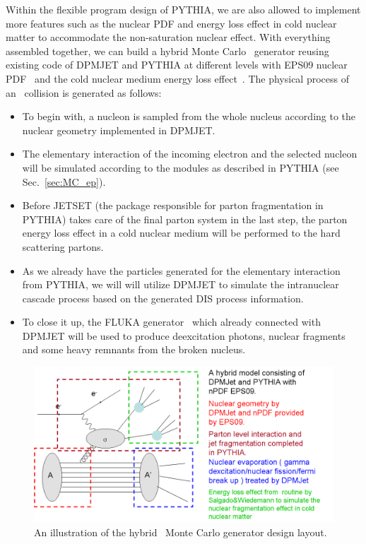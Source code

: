 Within the flexible program design of PYTHIA, we are also allowed to implement
more features such as the nuclear PDF and energy loss effect in cold nuclear
matter to accommodate the non-saturation nuclear effect. 
With everything assembled together, we can build a hybrid Monte Carlo \eA\ generator reusing existing
code of DPMJET and PYTHIA at different levels with EPS09 nuclear PDF~\cite{Eskola:2009uj}
and the cold nuclear medium energy loss effect~\cite{Salgado:2003gb}. The physical process of an \eA\ collision is
generated as follows:

\begin{itemize}
    \item To begin with, a nucleon is sampled from the whole nucleus according to the nuclear geometry implemented in DPMJET.
    \item The elementary interaction of the incoming electron and the selected nucleon will be simulated according to the modules as described in PYTHIA (see Sec.~\ref{sec:MC_ep}).
    \item Before JETSET (the package responsible for parton fragmentation in PYTHIA) takes care of the final parton system in the last step, the parton energy loss effect in a cold nuclear medium will be performed to the hard scattering partons. 
    \item As we already have the particles generated for the elementary interaction from PYTHIA, we will will utilize DPMJET to simulate the intranuclear cascade process based on the generated DIS process information.
    \item To close it up, the FLUKA generator~\cite{Ferrari:1995cq} which already connected with DPMJET will be used to produce deexcitation photons, nuclear fragments and some heavy remnants from the broken nucleus.
\end{itemize}

\begin{figure}
\centering
\includegraphics[width=1.0\textwidth]{plots/chpt5/eA_hybrid_chart.png} 
\caption[An illustration of the hybrid \eA\ Monte Carlo generator design layout] {
An illustration of the hybrid \eA\ Monte Carlo generator design layout. }
\label{fig:MC_hybrid_chart}
\end{figure}

